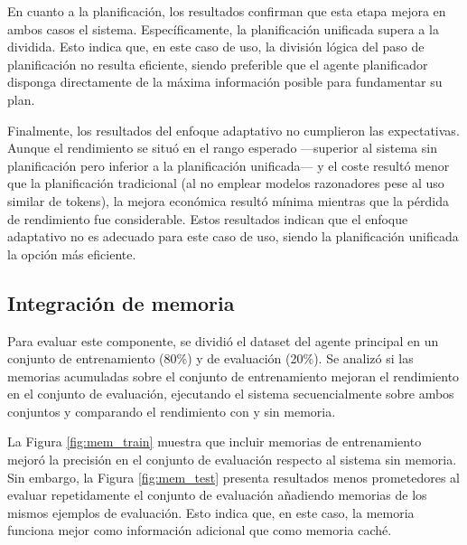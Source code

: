 En cuanto a la planificación, los resultados confirman que esta etapa mejora en ambos casos el sistema. Específicamente, la planificación unificada supera a la dividida. Esto indica que, en este caso de uso, la división lógica del paso de planificación no resulta eficiente, siendo preferible que el agente planificador disponga directamente de la máxima información posible para fundamentar su plan.

Finalmente, los resultados del enfoque adaptativo no cumplieron las expectativas. Aunque el rendimiento se situó en el rango esperado —superior al sistema sin planificación pero inferior a la planificación unificada— y el coste resultó menor que la planificación tradicional (al no emplear modelos razonadores pese al uso similar de tokens), la mejora económica resultó mínima mientras que la pérdida de rendimiento fue considerable. Estos resultados indican que el enfoque adaptativo no es adecuado para este caso de uso, siendo la planificación unificada la opción más eficiente.

\subsection{Integración de memoria}
Para evaluar este componente, se dividió el dataset del agente principal en un conjunto de entrenamiento (80\%) y de evaluación (20\%). Se analizó si las memorias acumuladas sobre el conjunto de entrenamiento mejoran el rendimiento en el conjunto de evaluación, ejecutando el sistema secuencialmente sobre ambos conjuntos y comparando el rendimiento con y sin memoria.

La Figura \ref{fig:mem_train} muestra que incluir memorias de entrenamiento mejoró la precisión en el conjunto de evaluación respecto al sistema sin memoria. Sin embargo, la Figura \ref{fig:mem_test} presenta resultados menos prometedores al evaluar repetidamente el conjunto de evaluación añadiendo memorias de los mismos ejemplos de evaluación. Esto indica que, en este caso, la memoria funciona mejor como información adicional que como memoria caché.


